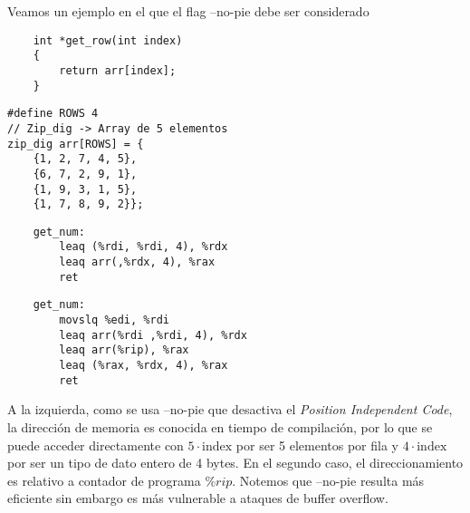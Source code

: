 \begin{ejemplo}
    Veamos un ejemplo en el que el flag --no-pie debe ser considerado
    \begin{center}
        \begin{minipage}{0.45\textwidth}
            \begin{verbatim}
    int *get_row(int index) 
    {
        return arr[index];
    }
            \end{verbatim}
        \end{minipage}
        \begin{minipage}{0.45\textwidth}
            \begin{verbatim}
#define ROWS 4
// Zip_dig -> Array de 5 elementos
zip_dig arr[ROWS] = {
    {1, 2, 7, 4, 5},
    {6, 7, 2, 9, 1},
    {1, 9, 3, 1, 5},
    {1, 7, 8, 9, 2}};
            \end{verbatim}
        \end{minipage}
        \vspace{0.5cm}
        \vspace{0.5cm}
        \begin{minipage}{0.45\textwidth}
            \begin{verbatim}
    get_num:
        leaq (%rdi, %rdi, 4), %rdx
        leaq arr(,%rdx, 4), %rax
        ret
            \end{verbatim}
        \end{minipage}
        \begin{minipage}{0.45\textwidth}
            \begin{verbatim}
    get_num:
        movslq %edi, %rdi
        leaq arr(%rdi ,%rdi, 4), %rdx
        leaq arr(%rip), %rax
        leaq (%rax, %rdx, 4), %rax
        ret
        \end{verbatim}
        \end{minipage}
    \end{center}
    A la izquierda, como se usa --no-pie que desactiva el \textit{Position Independent Code}, la dirección de memoria es conocida en tiempo de compilación, por lo que
    se puede acceder directamente con $ 5 \cdot \text{index}$ por ser 5 elementos por fila y $4 \cdot \text{index}$ por ser un tipo de dato entero de 4 bytes.
    En el segundo caso, el direccionamiento es relativo a contador de programa $\%rip$. Notemos que --no-pie resulta más eficiente sin embargo es más vulnerable a ataques de buffer overflow.
\end{ejemplo}
